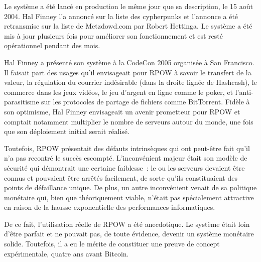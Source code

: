Le système a été lancé en production le même jour que sa description, le 15 août 2004. Hal Finney l'a annoncé sur la liste des cypherpunks et l'annonce a été retransmise sur la liste de Metzdowd.com par Robert Hettinga. Le système a été mis à jour plusieurs fois pour améliorer son fonctionnement et est resté opérationnel pendant des mois.

Hal Finney a présenté son système à la CodeCon 2005 organisée à San Francisco. Il faisait part des usages qu'il envisageait pour RPOW à savoir le transfert de la valeur, la régulation du courrier indésirable (dans la droite lignée de Hashcash), le commerce dans les jeux vidéos, le jeu d'argent en ligne comme le poker, et l'anti-parasitisme sur les protocoles de partage de fichiers comme BitTorrent. Fidèle à son optimisme, Hal Finney envisageait un avenir prometteur pour RPOW et comptait notamment multiplier le nombre de serveurs autour du monde, une fois que son déploiement initial serait réalisé.

Toutefois, RPOW présentait des défauts intrinsèques qui ont peut-être fait qu'il n'a pas recontré le succès escompté. L'inconvénient majeur était son modèle de sécurité qui démontrait une certaine faiblesse~: le ou les serveurs devaient être connus et pouvaient être arrêtés facilement, de sorte qu'ils constituaient des points de défaillance unique. De plus, un autre inconvénient venait de sa politique monétaire qui, bien que théoriquement viable, n'était pas spécialement attractive en raison de la hausse exponentielle des performances informatiques.

De ce fait, l'utilisation réelle de RPOW a été anecdotique. Le système était loin d'être parfait et ne pouvait pas, de toute évidence, devenir un système monétaire solide. Toutefois, il a eu le mérite de constituer une preuve de concept expérimentale, quatre ans avant Bitcoin. %

